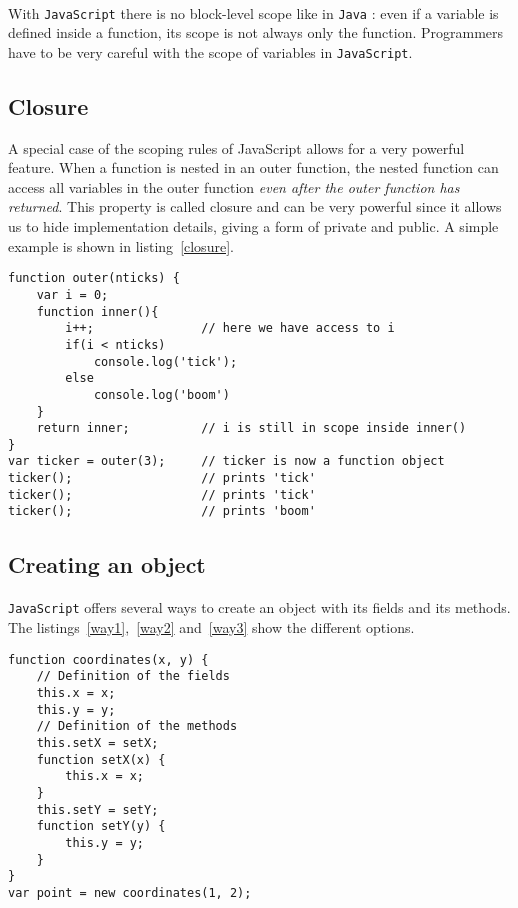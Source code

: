 \paragraph{}
With \texttt{JavaScript} there is no block-level scope like in \texttt{Java} : even if a variable is defined inside a function, its scope is not always only the function. Programmers have to be very careful with the scope of variables in \texttt{JavaScript}.
\subsection{Closure}
A special case of the scoping rules of JavaScript allows for a very powerful feature. When a function is nested in an outer function, the nested function can access all variables in the outer function \emph{even after the outer function has returned}. This property is called closure and can be very powerful since it allows us to hide implementation details, giving a form of private and public. A simple example is shown in listing~\ref{closure}.
\begin{lstlisting}[caption={Example of closure}, label={closure}]
function outer(nticks) {
	var i = 0;
	function inner(){
		i++;               // here we have access to i
		if(i < nticks)
			console.log('tick');
		else
			console.log('boom')
	}
	return inner;          // i is still in scope inside inner()
}
var ticker = outer(3);     // ticker is now a function object
ticker();                  // prints 'tick'
ticker();                  // prints 'tick'
ticker();                  // prints 'boom'
\end{lstlisting}
\subsection{Creating an object}
\paragraph{}
\texttt{JavaScript} offers several ways to create an object with its fields and its methods. The listings~\ref{way1},~\ref{way2} and~\ref{way3} show the different options.
        
\begin{lstlisting}[caption={Creating an object with a constructor}, label={way1}]
function coordinates(x, y) {
    // Definition of the fields
    this.x = x;
    this.y = y;
    // Definition of the methods
    this.setX = setX;
    function setX(x) {
        this.x = x;
    }
    this.setY = setY;
    function setY(y) {
        this.y = y;
    }
}
var point = new coordinates(1, 2);
\end{lstlisting}
        
